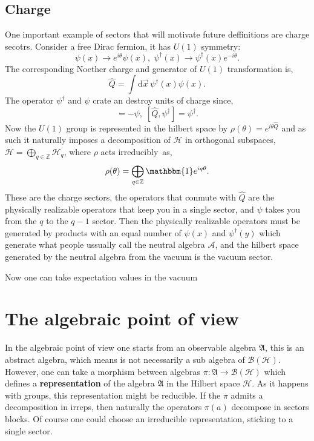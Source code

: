 \subsection{Charge}
One important example of sectors that will motivate future deffinitions
are charge secotrs. Consider a free Dirac fermion, it has $U(1)$ symmetry:
\begin{equation*}
    \psi(x)\rightarrow e^{i \theta} \psi(x),\;
    \psi^\dagger(x) \rightarrow \psi^\dagger(x)e^{-i \theta}.
\end{equation*}
The corresponding Noether charge and generator of $U(1)$ transformation
is,
\begin{equation*}
   \hat{Q}=\int\mathrm{d}\vec{x}\,\psi^\dagger(x)\psi(x).
\end{equation*}
The operator $\psi^\dagger$ and $\psi$ crate an destroy units of charge
since,
\begin{equation*}
    [\hat{Q},\psi]=-\psi, \; [\hat{Q},\psi^\dagger]=\psi^\dagger.
\end{equation*}
Now the $U(1)$ group is represented in the hilbert space by 
$\rho(\theta)=e^{i\theta\hat{Q}}$ and as such it naturally imposes
a decomposition of $\mathcal{H}$ in orthogonal subspaces,
$\mathcal{H}=\bigoplus_{q\in\mathbb{Z}} \mathcal{H}_q$, where $\rho$
acts irreducibly\footnotemark\, as,
\begin{equation*}
    \rho(\theta)=\bigoplus_{q\in\mathbb{Z}} \mathbbm{1}e^{iq\theta}.
\end{equation*}
These are the charge sectors, the operators that conmute with $\hat{Q}$ 
are the physically realizable operators that keep you in a single sector,
and $\psi$ takes you from the $q$ to the $q-1$ sector. Then the physically
realizable operators must be generated by products with an equal number
of $\psi(x)$ and $\psi^\dagger(y)$ which generate what people ussually call 
the neutral algebra $\mathcal{A}$, and the hilbert space generated by the neutral algebra 
from the vacuum is the vacuum sector.

Now one can take expectation values in the vacuum
\section{The algebraic point of view}
In the algebraic point of view one starts from an observable algebra 
$\mathfrak{A}$, this is an abstract algebra, which means is not necessarily 
a sub algebra of $\mathcal{B}(\mathcal{H})$. However, one can take a morphism 
between algebras $\pi: \mathfrak{A} \rightarrow \mathcal{B}(\mathcal{H})$ 
which defines a \textbf{representation} of the algebra $\mathfrak{A}$ in 
the Hilbert space $\mathcal{H}$. As it happens with groups,
this  representation might be reducible\footnotemark. If the $\pi$
admits a decomposition in irreps\footnotemark, then naturally the operators
$\pi(a)$ decompose in sectors blocks. Of course one could choose an 
irreducible representation, sticking to a single sector.

